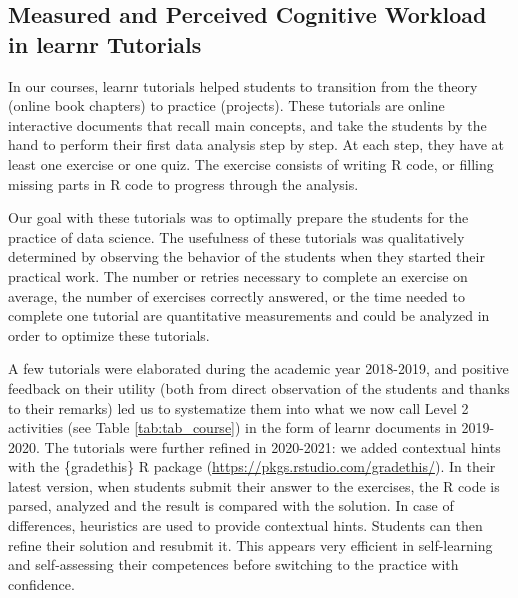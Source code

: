 \documentclass{aims}
\theoremstyle{definition}
\begin{document}
\hypertarget{measured-and-perceived-cognitive-workload-in-learnr-tutorials-1}{%
\subsection{Measured and Perceived Cognitive Workload in learnr
Tutorials}\label{measured-and-perceived-cognitive-workload-in-learnr-tutorials-1}}

In our courses, learnr tutorials helped students to transition from the
theory (online book chapters) to practice (projects). These tutorials
are online interactive documents that recall main concepts, and take the
students by the hand to perform their first data analysis step by step.
At each step, they have at least one exercise or one quiz. The exercise
consists of writing R code, or filling missing parts in R code to
progress through the analysis.

Our goal with these tutorials was to optimally prepare the students for
the practice of data science. The usefulness of these tutorials was
qualitatively determined by observing the behavior of the students when
they started their practical work. The number or retries necessary to
complete an exercise on average, the number of exercises correctly
answered, or the time needed to complete one tutorial are quantitative
measurements and could be analyzed in order to optimize these tutorials.

A few tutorials were elaborated during the academic year 2018-2019, and
positive feedback on their utility (both from direct observation of the
students and thanks to their remarks) led us to systematize them into
what we now call Level 2 activities (see Table \ref {tab:tab_course}) in
the form of learnr documents in 2019-2020. The tutorials were further
refined in 2020-2021: we added contextual hints with the \{gradethis\} R
package (\url{https://pkgs.rstudio.com/gradethis/}). In their latest
version, when students submit their answer to the exercises, the R code
is parsed, analyzed and the result is compared with the solution. In
case of differences, heuristics are used to provide contextual hints.
Students can then refine their solution and resubmit it. This appears
very efficient in self-learning and self-assessing their competences
before switching to the practice with confidence.
\end{document}
